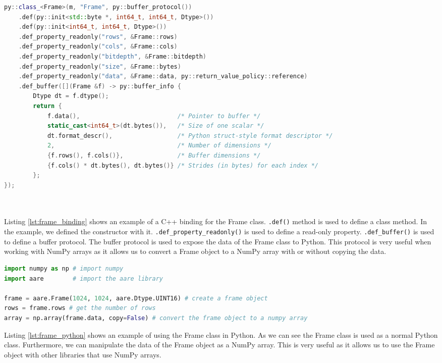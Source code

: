 \begin{spacing}{1.2}
    \begin{lstlisting}[language=C++, caption=Example of a C++ binding for the Frame class,label=lst:frame_binding]
py::class_<Frame>(m, "Frame", py::buffer_protocol())
    .def(py::init<std::byte *, int64_t, int64_t, Dtype>())
    .def(py::init<int64_t, int64_t, Dtype>())
    .def_property_readonly("rows", &Frame::rows)
    .def_property_readonly("cols", &Frame::cols)
    .def_property_readonly("bitdepth", &Frame::bitdepth)
    .def_property_readonly("size", &Frame::bytes)
    .def_property_readonly("data", &Frame::data, py::return_value_policy::reference)
    .def_buffer([](Frame &f) -> py::buffer_info {
        Dtype dt = f.dtype();
        return {
            f.data(),                           /* Pointer to buffer */
            static_cast<int64_t>(dt.bytes()),   /* Size of one scalar */
            dt.format_descr(),                  /* Python struct-style format descriptor */
            2,                                  /* Number of dimensions */
            {f.rows(), f.cols()},               /* Buffer dimensions */
            {f.cols() * dt.bytes(), dt.bytes()} /* Strides (in bytes) for each index */
        };
});

        
    \end{lstlisting}

    Listing \ref{lst:frame_binding} shows an example of a C++ binding for the Frame class.
    \lstinline|.def()| method is used to define a class method. In the example, we defined
    the constructor with it. \lstinline|.def_property_readonly()| is used to define a read-only property.
    \lstinline|.def_buffer()| is used to define a buffer protocol. The buffer protocol is used to expose
    the data of the Frame class to Python. This protocol is very useful when working with NumPy arrays
    as it allows us to convert a Frame object to a NumPy array with or without copying the data.\\

    \begin{lstlisting}[language=Python, caption=Example of using the Frame class in Python,label=lst:frame_python]
import numpy as np # import numpy
import aare        # import the aare library

frame = aare.Frame(1024, 1024, aare.Dtype.UINT16) # create a frame object
rows = frame.rows # get the number of rows
array = np.array(frame.data, copy=False) # convert the frame object to a numpy array
    \end{lstlisting}

    Listing \ref{lst:frame_python} shows an example of using the Frame class in Python.
    As we can see the Frame class is used as a normal Python class. Furthermore, we can
    manipulate the data of the Frame object as a NumPy array. This is very useful as it allows
    us to use the Frame object with other libraries that use NumPy arrays.\\



\end{spacing}
